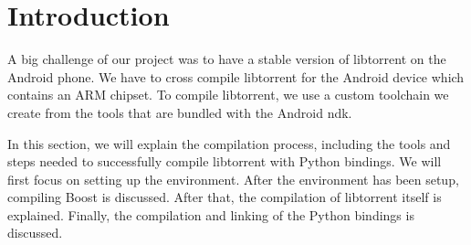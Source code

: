 \section{Introduction}
	A big challenge of our project was to have a stable version of libtorrent on the Android phone. We have to cross compile libtorrent for the Android device which contains an ARM chipset. To compile libtorrent, we use a custom toolchain we create from the tools that are bundled with the Android ndk.
	
	In this section, we will explain the compilation process, including the tools and steps needed to successfully compile libtorrent with Python bindings. We will first focus on setting up the environment. After the environment has been setup, compiling Boost is discussed. After that, the compilation of libtorrent itself is explained. Finally, the compilation and linking of the Python bindings is discussed.